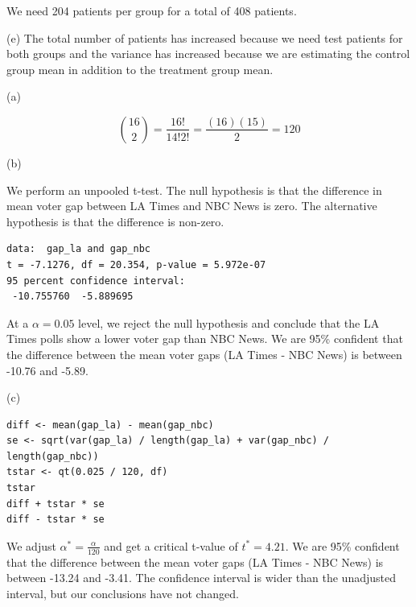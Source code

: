 \documentclass[11pt]{article}
\begin{document}
We need 204 patients per group for a total of 408 patients.

\vspace{0.1in}

\noindent (e) The total number of patients has increased because we need test patients for both groups and the variance has increased because we are estimating the control group mean in addition to the treatment group mean.

\pagebreak



\noindent (a)

$$\binom{16}{2} = \frac{16!}{14!2!} = \frac{(16)(15)}{2} = 120$$

\vspace{0.1in}

\noindent (b)

We perform an unpooled t-test.  The null hypothesis is that the difference in mean voter gap between LA Times and NBC News is zero.  The alternative hypothesis is that the difference is non-zero.

\begin{verbatim}
data:  gap_la and gap_nbc
t = -7.1276, df = 20.354, p-value = 5.972e-07
95 percent confidence interval:
 -10.755760  -5.889695
\end{verbatim}

At a $\alpha = 0.05$ level, we reject the null hypothesis and conclude that the LA Times polls show a lower voter gap than NBC News.  We are 95\% confident that the difference between the mean voter gaps (LA Times - NBC News) is between -10.76 and -5.89.

\vspace{0.1in}

\noindent (c)

\begin{verbatim}
diff <- mean(gap_la) - mean(gap_nbc)
se <- sqrt(var(gap_la) / length(gap_la) + var(gap_nbc) / length(gap_nbc))
tstar <- qt(0.025 / 120, df)
tstar
diff + tstar * se
diff - tstar * se
\end{verbatim}

We adjust $\alpha^* = \frac{\alpha}{120}$ and get a critical t-value of $t^* = 4.21$.  We are 95\% confident that the difference between the mean voter gaps (LA Times - NBC News) is between -13.24 and -3.41.  The confidence interval is wider than the unadjusted interval, but our conclusions have not changed.

\vspace{0.1in}
\end{document}
